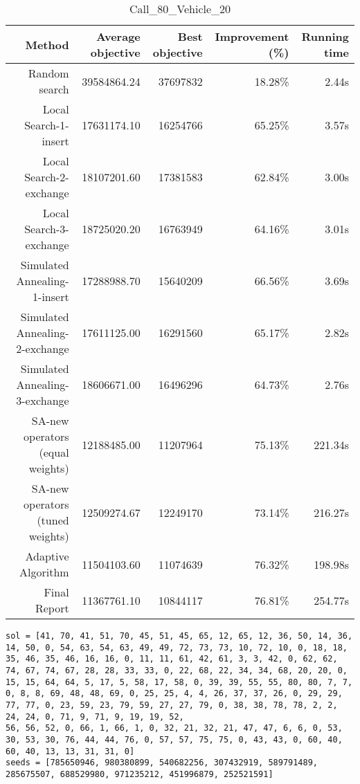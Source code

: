 \begin{table}[ht]
\centering
\caption{Call\_80\_Vehicle\_20}
\label{tab:call80vehicle20}
\begin{tabular}{|r|r|r|r|r|}
Method & Average objective & Best objective & Improvement (\%) & Running time \\
\hline
Random search & 39584864.24 & 37697832 & 18.28\% & 2.44s\\
Local Search-1-insert & 17631174.10 & 16254766 & 65.25\% & 3.57s\\
Local Search-2-exchange & 18107201.60 & 17381583 & 62.84\% & 3.00s\\
Local Search-3-exchange & 18725020.20 & 16763949 & 64.16\% & 3.01s\\
Simulated Annealing-1-insert & 17288988.70 & 15640209 & 66.56\% & 3.69s\\
Simulated Annealing-2-exchange & 17611125.00 & 16291560 & 65.17\% & 2.82s\\
Simulated Annealing-3-exchange & 18606671.00 & 16496296 & 64.73\% & 2.76s\\
SA-new operators (equal weights) & 12188485.00 & 11207964 & 75.13\% & 221.34s\\
SA-new operators (tuned weights) & 12509274.67 & 12249170 & 73.14\% & 216.27s\\
Adaptive Algorithm & 11504103.60 & 11074639 & 76.32\% & 198.98s\\
Final Report & 11367761.10 & 10844117 & 76.81\% & 254.77s\\
\end{tabular}%
\end{table}
\begin{lstlisting}[label={lst:call80vehicle20},caption=Optimal solution call\_80\_vehicle\_20]
sol = [41, 70, 41, 51, 70, 45, 51, 45, 65, 12, 65, 12, 36, 50, 14, 36, 14, 50, 0, 54, 63, 54, 63, 49, 49, 72, 73, 73, 10, 72, 10, 0, 18, 18, 35, 46, 35, 46, 16, 16, 0, 11, 11, 61, 42, 61, 3, 3, 42, 0, 62, 62, 74, 67, 74, 67, 28, 28, 33, 33, 0, 22, 68, 22, 34, 34, 68, 20, 20, 0, 15, 15, 64, 64, 5, 17, 5, 58, 17, 58, 0, 39, 39, 55, 55, 80, 80, 7, 7, 0, 8, 8, 69, 48, 48, 69, 0, 25, 25, 4, 4, 26, 37, 37, 26, 0, 29, 29, 77, 77, 0, 23, 59, 23, 79, 59, 27, 27, 79, 0, 38, 38, 78, 78, 2, 2, 24, 24, 0, 71, 9, 71, 9, 19, 19, 52, 
56, 56, 52, 0, 66, 1, 66, 1, 0, 32, 21, 32, 21, 47, 47, 6, 6, 0, 53, 30, 53, 30, 76, 44, 44, 76, 0, 57, 57, 75, 75, 0, 43, 43, 0, 60, 40, 60, 40, 13, 13, 31, 31, 0]
seeds = [785650946, 980380899, 540682256, 307432919, 589791489, 285675507, 688529980, 971235212, 451996879, 252521591]
\end{lstlisting}%
\clearpage


